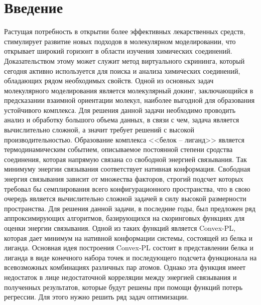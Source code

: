 \documentclass[12pt, twoside]{article}
\begin{document}
\section{Введение}
Растущая потребность в открытии более эффективных лекарственных средств, стимулирует развитие новых подходов в молекулярном моделировании, что открывает широкий горизонт в области изучения химических соединений. Доказательством этому может служит метод виртуального скрининга, который сегодня активно используется для поиска и анализа  химических соединений, обладающих рядом необходимых свойств\cite{mannhold2011virtual}.
Одной из основных задач молекулярного моделирования является молекулярный докинг, заключающийся в предсказании взаимной ориентации молекул, наиболее выгодной для образования устойчивого комплекса\cite{lengauer1996computational}. Для решения данной задачи необходимо проводить анализ и обработку большого объема данных, в связи с чем, задача является вычислительно сложной, а значит требует решений с высокой производительностью.   
Образование комплекса <<белок -- лиганд>> является термодинамическим событием, описываемое постоянной степени сродства соединения, которая напрямую связана со свободной энергией связывания. Так минимуму энергии связывания соответствует нативная конформация. Свободная энергия связывания зависит от множества факторов, строгий подсчет которых требовал бы семплирования всего конфигурационного пространства, что в свою очередь является вычислительно сложной задачей в силу высокой размерности пространства\cite{kadukova2017convex}. Для решения данной задачи, в последние годы, был предложен ряд аппроксимирующих алгоритмов, базирующихся на скоринговых функциях\cite{meng2011molecular} для оценки энергии связывания.
Одной из таких функций является Convex-PL\cite{kadukova2017convex}, которая дает минимум на нативной конформации системы, состоящей из белка и лиганда. Основная идея построения Convex-PL состоит в представлении белка и лиганда в виде конечного набора точек и последующего подсчета функционала на всевозможных комбинациях различных пар атомов. Однако эта функция имеет недостаток в лице недостаточной корреляции между энергией связывания и полученных результатов, которые будут решены при помощи функций потерь регрессии. Для этого нужно решить ряд задач оптимизации\cite{boyd2004convex}.
\newpage





\end{document}
